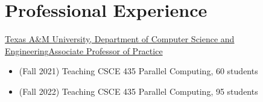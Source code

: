 \section{Professional Experience}

		{\href{https://engineering.tamu.edu/cse/index.html}{Texas A\&M University, Department of Computer Science and Engineering}}{\href{https://engineering.tamu.edu/cse/profiles/pearce-olga.html}{Associate Professor of Practice}}{}{}
		{\begin{itemize}
		  \item (Fall 2021) Teaching CSCE 435 Parallel Computing, 60 students
		  \item (Fall 2022) Teaching CSCE 435 Parallel Computing, 95 students
		\end{itemize}}

